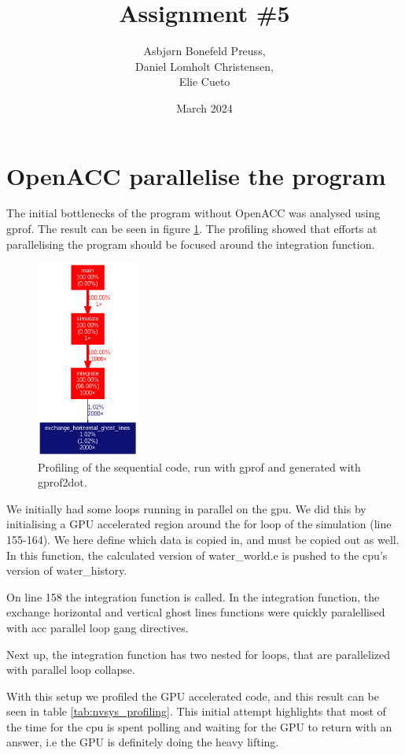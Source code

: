 \documentclass{article}
\title{Assignment \#5}
\author{Asbjørn Bonefeld Preuss,\\ Daniel Lomholt Christensen,\\ Elie Cueto}
\date{March 2024}
\begin{document}
\maketitle
\section{OpenACC parallelise the program}
The initial bottlenecks of the program without OpenACC was analysed using gprof. The result can be seen in figure \ref{fig:profiling:seq}. The profiling showed that efforts at parallelising the program should be focused around the integration function.
\begin{figure}
    \includegraphics[width=0.3\textwidth]{./figures/sequential_profile.png}
    \centering
    \caption{Profiling of the sequential code, run with gprof and generated with gprof2dot.}
    \label{fig:profiling:seq}
\end{figure}
We initially had some loops running in parallel on the gpu. 
We did this by initialising a GPU accelerated region around the for loop of the simulation (line 155-164).
We here define which data is copied in, and must be copied out as well. In this function, the calculated version of water\_world.e is pushed to the cpu's version of water\_history.

On line 158 the integration function is called. In the integration function, the exchange horizontal and vertical ghost lines functions were quickly paralellised with acc parallel loop gang directives.

Next up, the integration function has two nested for loops, that are parallelized with parallel loop collapse.

With this setup we profiled the GPU accelerated code, and this result can be seen in table \ref{tab:nvsys_profiling}. This initial attempt highlights that most of the time for the cpu is spent polling and waiting for the GPU to return with an answer, i.e the GPU is definitely doing the heavy lifting.
\end{document}
